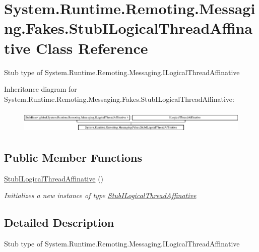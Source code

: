 \hypertarget{class_system_1_1_runtime_1_1_remoting_1_1_messaging_1_1_fakes_1_1_stub_i_logical_thread_affinative}{\section{System.\-Runtime.\-Remoting.\-Messaging.\-Fakes.\-Stub\-I\-Logical\-Thread\-Affinative Class Reference}
\label{class_system_1_1_runtime_1_1_remoting_1_1_messaging_1_1_fakes_1_1_stub_i_logical_thread_affinative}
}


Stub type of System.\-Runtime.\-Remoting.\-Messaging.\-I\-Logical\-Thread\-Affinative 


Inheritance diagram for System.\-Runtime.\-Remoting.\-Messaging.\-Fakes.\-Stub\-I\-Logical\-Thread\-Affinative\-:\begin{figure}[H]
\begin{center}
\leavevmode
\includegraphics[height=1.154639cm]{class_system_1_1_runtime_1_1_remoting_1_1_messaging_1_1_fakes_1_1_stub_i_logical_thread_affinative}
\end{center}
\end{figure}
\subsection*{Public Member Functions}
\begin{DoxyCompactItemize}
\item 
\hyperlink{class_system_1_1_runtime_1_1_remoting_1_1_messaging_1_1_fakes_1_1_stub_i_logical_thread_affinative_a06b98513ea29433e1d55d6d7f04af3ee}{Stub\-I\-Logical\-Thread\-Affinative} ()
\begin{DoxyCompactList}\small\item\em Initializes a new instance of type \hyperlink{class_system_1_1_runtime_1_1_remoting_1_1_messaging_1_1_fakes_1_1_stub_i_logical_thread_affinative}{Stub\-I\-Logical\-Thread\-Affinative}\end{DoxyCompactList}\end{DoxyCompactItemize}


\subsection{Detailed Description}
Stub type of System.\-Runtime.\-Remoting.\-Messaging.\-I\-Logical\-Thread\-Affinative



